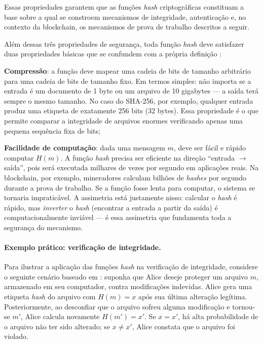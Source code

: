 Essas propriedades garantem que as funções \textit{hash} criptográficas constituam a base sobre a qual se constroem mecanismos de integridade, autenticação e, no contexto da blockchain, os mecanismos de prova de trabalho descritos a seguir.

Além dessas três propriedades de segurança, toda função \textit{hash} deve satisfazer duas propriedades básicas que se confundem com a própria definição \cite{tomaz2014}:

\begin{alineas}
    \item \textbf{Compressão}: a função deve mapear uma cadeia de bits de tamanho arbitrário para uma cadeia de bits de tamanho fixo. Em termos simples: não importa se a entrada é um documento de 1 byte ou um arquivo de 10 gigabytes --- a saída terá sempre o mesmo tamanho. No caso do SHA-256, por exemplo, qualquer entrada produz uma etiqueta de exatamente 256 bits (32 bytes). Essa propriedade é o que permite comparar a integridade de arquivos enormes verificando apenas uma pequena sequência fixa de bits;
    \item \textbf{Facilidade de computação}: dada uma mensagem $m$, deve ser fácil e rápido computar $H(m)$. A função \textit{hash} precisa ser eficiente na direção ``entrada $\to$ saída'', pois será executada milhares de vezes por segundo em aplicações reais. Na blockchain, por exemplo, mineradores calculam bilhões de \textit{hashes} por segundo durante a prova de trabalho. Se a função fosse lenta para computar, o sistema se tornaria impraticável. A assimetria está justamente nisso: calcular o \textit{hash} é rápido, mas \textit{inverter} o \textit{hash} (encontrar a entrada a partir da saída) é computacionalmente inviável --- é essa assimetria que fundamenta toda a segurança do mecanismo.
\end{alineas}

\paragraph{Exemplo prático: verificação de integridade.}

Para ilustrar a aplicação das funções \textit{hash} na verificação de integridade, considere o seguinte cenário baseado em : suponha que Alice deseje proteger um arquivo $m$, armazenado em seu computador, contra modificações indevidas. Alice gera uma etiqueta \textit{hash} do arquivo com $H(m) = x$ após sua última alteração legítima. Posteriormente, ao desconfiar que o arquivo sofreu alguma modificação e tornou-se $m'$, Alice calcula novamente $H(m') = x'$. Se $x = x'$, há alta probabilidade de o arquivo não ter sido alterado; se $x \neq x'$, Alice constata que o arquivo foi violado.

